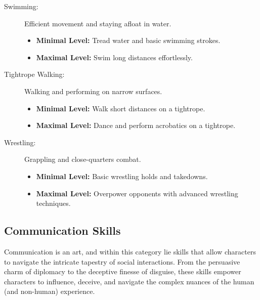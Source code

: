 \begin{description}
    \item[Swimming:] Efficient movement and staying afloat in water.
        \begin{itemize}
            \item \textbf{Minimal Level:} Tread water and basic swimming strokes.
            \item \textbf{Maximal Level:} Swim long distances effortlessly.
        \end{itemize}

    \item[Tightrope Walking:] Walking and performing on narrow surfaces.
        \begin{itemize}
            \item \textbf{Minimal Level:} Walk short distances on a tightrope.
            \item \textbf{Maximal Level:} Dance and perform acrobatics on a tightrope.
        \end{itemize}

    \item[Wrestling:] Grappling and close-quarters combat.
        \begin{itemize}
            \item \textbf{Minimal Level:} Basic wrestling holds and takedowns.
            \item \textbf{Maximal Level:} Overpower opponents with advanced wrestling techniques.
        \end{itemize}
\end{description}

\subsection{\textbf{Communication Skills}}

Communication is an art, and within this category lie skills that allow characters to navigate the intricate tapestry of social interactions. From the persuasive charm of diplomacy to the deceptive finesse of disguise, these skills empower characters to influence, deceive, and navigate the complex nuances of the human (and non-human) experience.

